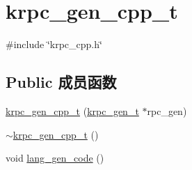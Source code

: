 \hypertarget{classkrpc__gen__cpp__t}{}\section{krpc\+\_\+gen\+\_\+cpp\+\_\+t}
\label{classkrpc__gen__cpp__t}


{\ttfamily \#include \char`\"{}krpc\+\_\+cpp.\+h\char`\"{}}

\subsection*{Public 成员函数}
\begin{DoxyCompactItemize}
\item 
\hyperlink{classkrpc__gen__cpp__t_a1f25da65bcb9b4c162ae3d69fbb645ca}{krpc\+\_\+gen\+\_\+cpp\+\_\+t} (\hyperlink{classkrpc__gen__t}{krpc\+\_\+gen\+\_\+t} $\ast$rpc\+\_\+gen)
\item 
\hyperlink{classkrpc__gen__cpp__t_af6942895991108184c2ccafb04dfc88f}{$\sim$krpc\+\_\+gen\+\_\+cpp\+\_\+t} ()
\item 
void \hyperlink{classkrpc__gen__cpp__t_ab15d4e7f98e7348e23ae60ccd830ff05}{lang\+\_\+gen\+\_\+code} ()
\end{DoxyCompactItemize}
